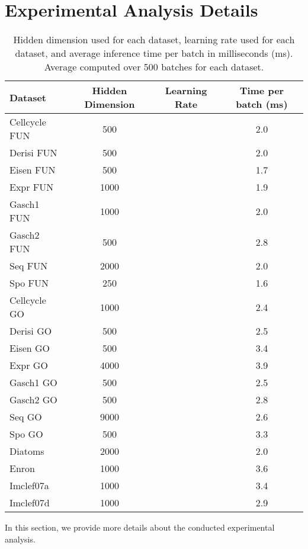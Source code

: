\documentclass{article}
\begin{document}
\section{Experimental Analysis Details}\label{app:hidden_dim}
\begin{table}[h]
    \centering
    \caption{Hidden dimension used for each dataset, learning rate used for each dataset, and average inference time per batch in milliseconds (ms). Average computed over 500 batches for each dataset.}
    \begin{tabular}{l c c c}
        \toprule
         {\sc Dataset} & Hidden Dimension &  Learning Rate & Time per batch (ms) \\
         \midrule
         {\sc Cellcycle FUN} & 500 &  & 2.0\\
         {\sc Derisi FUN} & 500 &  & 2.0\\
         {\sc Eisen FUN} & 500 &  & 1.7\\
         {\sc Expr FUN} & 1000 &  & 1.9\\
         {\sc Gasch1 FUN} & 1000 &  & 2.0\\
         {\sc Gasch2 FUN} & 500 &  & 2.8\\
         {\sc Seq FUN} & 2000 &  & 2.0\\
         {\sc Spo FUN} & 250&  & 1.6\\
         \midrule
         {\sc Cellcycle GO} & 1000 &  & 2.4 \\
         {\sc Derisi GO} & 500 &  & 2.5\\
         {\sc Eisen GO} & 500 &  &3.4\\
         {\sc Expr GO} & 4000 &   & 3.9\\
         {\sc Gasch1 GO} & 500 &  & 2.5\\
         {\sc Gasch2 GO} & 500 &  & 2.8\\
         {\sc Seq GO} & 9000 &  & 2.6 \\
         {\sc Spo GO} & 500 &  & 3.3\\
         \midrule
         {\sc Diatoms} & 2000 &  & 2.0\\
         {\sc Enron} & 1000 &  & 3.6\\
         {\sc Imclef07a} & 1000 &  & 3.4\\
         {\sc Imclef07d} & 1000 &  & 2.9\\
         \bottomrule
    \end{tabular}
    \label{tab:hidden_dim}
\end{table}
In this section, we provide more details about the conducted experimental analysis. 
\end{document}
